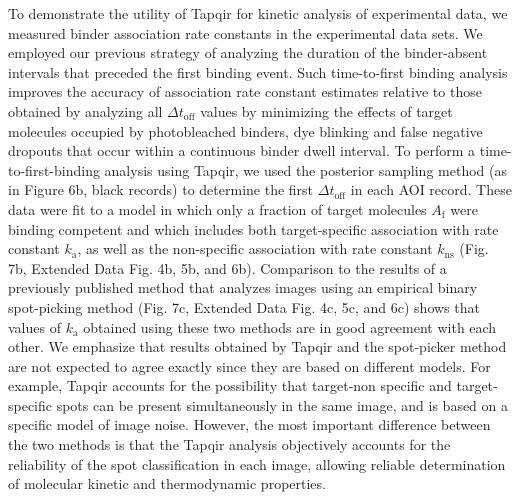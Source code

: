 To demonstrate the utility of Tapqir for kinetic analysis of experimental data, we measured binder association rate constants in the experimental data sets.  We employed our previous strategy \cite{Friedman2006-kb} of analyzing the duration of the binder-absent intervals that preceded the first binding event.  Such time-to-first binding analysis improves the accuracy of association rate constant estimates relative to those obtained by analyzing all $\Delta t_\mathrm{off}$ values by minimizing the effects of target molecules occupied by photobleached binders, dye blinking and false negative dropouts that occur within a continuous binder dwell interval.  To perform a time-to-first-binding analysis using Tapqir, we used the posterior sampling method (as in Figure 6b, black records) to determine the first $\Delta t_\mathrm{off}$ in each AOI record. These data were fit to a model \cite{Friedman2006-kb} in which only a fraction of target molecules $A_\mathrm{f}$ were binding competent and which includes both target-specific association with rate constant $k_\mathrm{a}$, as well as the non-specific association with rate constant $k_\mathrm{ns}$ (Fig. 7b, Extended Data Fig. 4b, 5b, and 6b). Comparison to the results of a previously published method that analyzes images using an empirical binary spot-picking method \cite{Friedman2006-kb} (Fig. 7c, Extended Data Fig. 4c, 5c, and 6c) shows that values of $k_\mathrm{a}$ obtained using these two methods are in good agreement with each other. We emphasize that results obtained by Tapqir and the spot-picker method are not expected to agree exactly since they are based on different models.  For example, Tapqir accounts for the possibility that target-non specific and target-specific spots can be present simultaneously in the same image, and is based on a specific model of image noise.  However, the most important difference between the two methods is that the Tapqir analysis objectively accounts for the reliability of the spot classification in each image, allowing reliable determination of molecular kinetic and thermodynamic properties.

